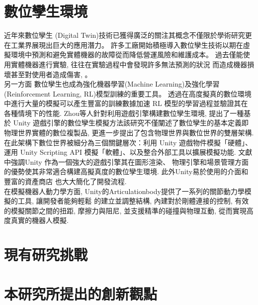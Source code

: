 \section{數位孿生環境}
近年來數位孿生 (Digital Twin)技術已獲得廣泛的關注其概念不僅限於學術研究更在工業界展現出巨大的應用潛力。
許多工廠開始積極導入數位孿生技術以期在虛擬環境中預測和避免實體機器的故障從而降低營運風險和維護成本。
過去僅能使用實體機器進行實驗, 往往在實驗過程中會發現許多無法預測的狀況
而造成機器損壞甚至對使用者造成傷害, 。\\
另一方面
數位孿生也成為強化機器學習(Machine Learning)及強化學習(Reinforcement Learning, RL)模型訓練的重要工具。
透過在高度擬真的數位環境中進行大量的模擬可以產生豐富的訓練數據加速 RL 模型的學習過程並驗證其在各種情境下的性能.
Zhou等人\cite{DigitalTwin}針對利用遊戲引擎構建數位孿生環境,
提出了一種基於 Unity 遊戲引擎的數位孿生模擬方法該研究不僅闡述了數位孿生的基本定義即物理世界實體的數位複製品,
更進一步提出了包含物理世界與數位世界的雙層架構. 在此架構下數位世界被細分為三個關鍵層次：利用 Unity 遊戲物件模擬「硬體」、
運用 Unity Scripting API 模擬「軟體」、以及整合外部工具以擴展模擬功能. 文獻中強調Unity 作為一個強大的遊戲引擎其在圖形渲染、
物理引擎和場景管理方面的優勢使其非常適合構建高擬真度的數位孿生環境. 此外Unity易於使用的介面和豐富的資產商店 也大大簡化了開發流程. \\
在模擬機器人動力學方面, Unity的Articulationbody\cite{UnityArticulation2024}提供了一系列的關節動力學模擬的工具, 讓開發者能夠輕鬆
的建立並調整結構, 內建對於剛體連接的控制, 有效的模擬關節之間的扭距, 摩擦力與阻尼, 並支援精準的碰撞與物理互動, 從而實現高度真實的機器人模擬.
\section{現有研究挑戰}
\section{本研究所提出的創新觀點}